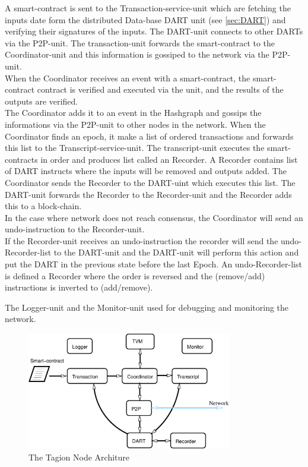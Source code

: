 A smart-contract is sent to the Transaction-service-unit which are fetching the inputs date form the distributed Data-base DART unit (see \cref{sec:DART}) and verifying their signatures of the inputs. The DART-unit connects to other DARTs via the P2P-unit. The transaction-unit forwards the smart-contract to the Coordinator-unit and this information is gossiped to the network via the P2P-unit.\\
When the Coordinator receives an event with a smart-contract, the smart-contract contract is verified and executed via the  unit, and the results of the outputs are verified.\\
The Coordinator adds it to an event in the Hashgraph and gossips the informations via the P2P-unit to other nodes in the network.    
When the Coordinator finds an epoch, it make a list of ordered transactions and forwards this list to the Transcript-service-unit. The transcript-unit executes the smart-contracts in order and produces list called an Recorder. A Recorder contains list of DART instructs where the inputs will be removed and outputs added. The Coordinator sends the Recorder to the DART-uint which executes this list. The DART-unit forwards the Recorder to the Recorder-unit and the Recorder adds this to a block-chain.\\
In the case where network does not reach consensus, the Coordinator will send an undo-instruction to the Recorder-unit.\\
If the Recorder-unit receives an undo-instruction the recorder will send the undo-Recorder-list to the DART-unit and the DART-unit will perform this action and put the DART in the previous state before the last Epoch.
An undo-Recorder-list is defined a Recorder where the order is reversed and the (remove/add) instructions is inverted to (add/remove).

The Logger-unit and the Monitor-unit used for debugging and monitoring the network.

\begin{figure}[H]
	\centering
	\includegraphics[width=0.8\textwidth]{fig/node_service.eps}
	\caption{The Tagion Node Architure}
	\label{fig:node_service}
\end{figure}


